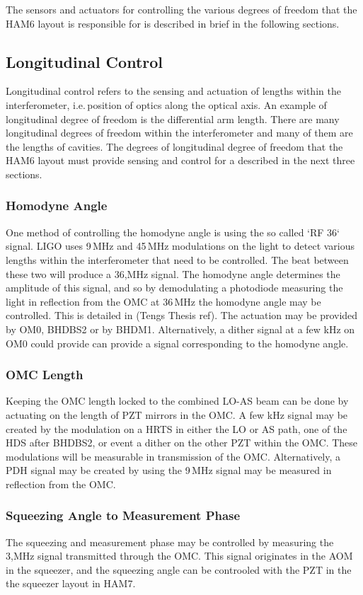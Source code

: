 \label{app:bhd_for_ligo_sensing_and_control}
The sensors and actuators for controlling the various degrees of freedom that the HAM6 layout is responsible for is described in brief in the following sections.
\subsection{Longitudinal Control}
Longitudinal control refers to the sensing and actuation of lengths within the interferometer, i.e.\,position of optics along the optical axis. An example of longitudinal degree of freedom is the differential arm length. There are many longitudinal degrees of freedom within the interferometer and many of them are the lengths of cavities. The degrees of longitudinal degree of freedom that the HAM6 layout must provide sensing and control for a described in the next three sections.
\subsubsection{Homodyne Angle}
One method of controlling the homodyne angle is using the so called `RF 36` signal. LIGO uses 9\,MHz and 45\,MHz modulations on the light to detect various lengths within the interferometer that need to be controlled. The beat between these two will produce a 36,MHz signal. The homodyne angle determines the amplitude of this signal, and so by demodulating a photodiode measuring the light in reflection from the OMC at 36\,MHz the homodyne angle may be controlled. This is detailed in (Tengs Thesis ref). The actuation may be provided by OM0, BHDBS2 or by BHDM1. Alternatively, a dither signal at a few kHz on OM0 could provide can provide a signal corresponding to the homodyne angle.
\subsubsection{OMC Length}
Keeping the OMC length locked to the combined LO-AS beam can be done by actuating on the length of PZT mirrors in the OMC. A few kHz signal may be created by the modulation on a HRTS in either the LO or AS path, one of the HDS after BHDBS2, or event a dither on the other PZT within the OMC. These modulations will be measurable in transmission of the OMC. Alternatively, a PDH signal may be created by using the 9\,MHz signal may be measured in reflection from the OMC.
\subsubsection{Squeezing Angle to Measurement Phase}
The squeezing and measurement phase may be controlled by measuring the 3,MHz signal transmitted through the OMC. This signal originates in the AOM in the squeezer, and the squeezing angle can be controoled with the PZT in the the squeezer layout in HAM7.
